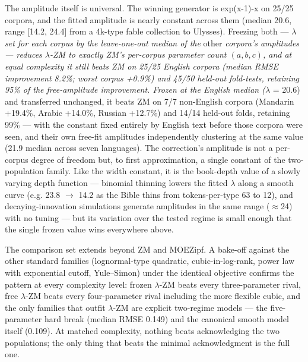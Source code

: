 \documentclass[11pt]{article}
\begin{document}
The amplitude itself is universal. The winning generator is exp(x-1)-x on 25/25 corpora, and the fitted amplitude is nearly constant across them (median 20.6, range [14.2, 24.4] from a 4k-type fable collection to Ulysses). Freezing both --- $\lambda$\emph{ set for each corpus by the leave-one-out median of the }other\emph{ corpora's amplitudes --- reduces $\lambda$-ZM to exactly ZM's per-corpus parameter count $(a, b, c)$, and at equal complexity it still beats ZM on 25/25 English corpora (median RMSE improvement 8.2\%; worst corpus +0.9\%) and 45/50 held-out fold-tests, retaining 95\% of the free-amplitude improvement. Frozen at the English median ($\lambda$} = 20.6) and transferred unchanged, it beats ZM on 7/7 non-English corpora (Mandarin +19.4\%, Arabic +14.0\%, Russian +12.7\%) and 14/14 held-out folds, retaining 99\% --- with the constant fixed entirely by English text before those corpora were seen, and their own free-fit amplitudes independently clustering at the same value (21.9 median across seven languages). The correction's amplitude is not a per-corpus degree of freedom but, to first approximation, a single constant of the two-population family. Like the width constant, it is the book-depth value of a slowly varying depth function --- binomial thinning lowers the fitted $\lambda$ along a smooth curve (e.g. 23.8 $\to$ 14.2 as the Bible thins from tokens-per-type 63 to 12), and decaying-innovation simulations generate amplitudes in the same range ($\approx$24) with no tuning --- but its variation over the tested regime is small enough that the single frozen value wins everywhere above.

The comparison set extends beyond ZM and MOEZipf. A bake-off against the other standard families (lognormal-type quadratic, cubic-in-log-rank, power law with exponential cutoff, Yule--Simon) under the identical objective confirms the pattern at every complexity level: frozen $\lambda$-ZM beats every three-parameter rival, free $\lambda$-ZM beats every four-parameter rival including the more flexible cubic, and the only families that outfit $\lambda$-ZM are explicit two-regime models --- the five-parameter hard break (median RMSE 0.149) and the canonical smooth model itself (0.109). At matched complexity, nothing beats acknowledging the two populations; the only thing that beats the minimal acknowledgment is the full one.
\end{document}
